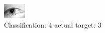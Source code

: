 \begin{figure}[h!]
\begin{center}
\includegraphics[width=0.60\columnwidth]{figures/ID1295_class_4_target_3.png}
\end{center}
\caption{ Classification: 4 actual target: 3}
\label{fig:ID1295_class_4_target_3}
\end{figure}
